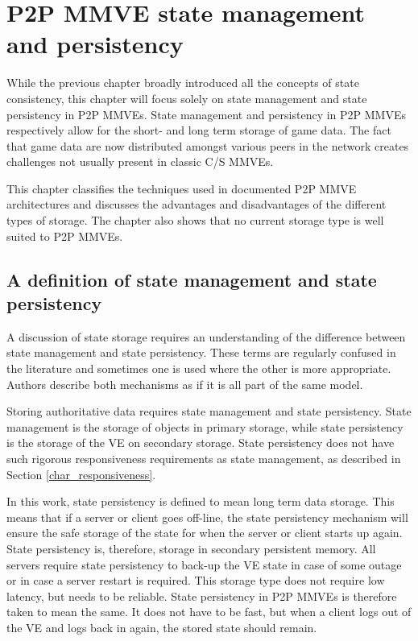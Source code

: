 \chapter{P2P MMVE state management and persistency}
\label{p2p_MMVE_state_persistency}

While the previous chapter broadly introduced all the concepts of state consistency, this chapter will focus solely on state management and state persistency in P2P MMVEs. State management and persistency in P2P MMVEs respectively allow for the short- and long term storage of game data. The fact that game data are now distributed amongst various peers in the network creates challenges not usually present in classic C/S MMVEs.

This chapter classifies the techniques used in documented P2P MMVE architectures and discusses the advantages and disadvantages of the different types of storage. The chapter also shows that no current storage type is well suited to P2P MMVEs.

\section{A definition of state management and state persistency}
\label{management_persistency_def}

A discussion of state storage requires an understanding of the difference between state management and state persistency. These terms are regularly confused in the literature and sometimes one is used where the other is more appropriate. Authors describe both mechanisms as if it is all part of the same model.

Storing authoritative data requires state management and state persistency. State management is the storage of objects in primary storage, while state persistency is the storage of the VE on secondary storage. State persistency does not have such rigorous responsiveness requirements as state management, as described in Section \ref{char_responsiveness}.

In this work, state persistency is defined to mean long term data storage. This means that if a server or client goes off-line, the state persistency mechanism will ensure the safe storage of the state for when the server or client starts up again. State persistency is, therefore, storage in secondary persistent memory. All servers require state persistency to back-up the VE state in case of some outage or in case a server restart is required. This storage type does not require low latency, but needs to be reliable. State persistency in P2P MMVEs is therefore taken to mean the same. It does not have to be fast, but when a client logs out of the VE and logs back in again, the stored state should remain.

